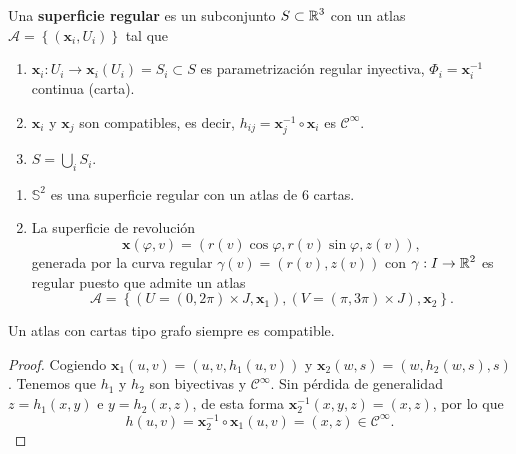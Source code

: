 \begin{definition}
	Una \textbf{superficie regular} es un subconjunto $\displaystyle S \subset \mathbb{R}^{3} $ con un atlas $\displaystyle \mathcal{A} = \left\{ \left( \textbf{x} _{i}, U_{i}\right)\right\}  $ tal que 
	\begin{enumerate}
	\item $\displaystyle \textbf{x} _{i} : U _{i}\to \textbf{x} _{i}\left(U_{i}\right)=S_{i} \subset S $ es parametrización regular inyectiva, $\displaystyle \Phi_{i} = \textbf{x} _{i}^{-1} $ continua (carta).
	\item $\displaystyle \textbf{x} _{i} $ y $\displaystyle \textbf{x} _{j} $ son compatibles, es decir, $\displaystyle h_{ij}= \textbf{x} _{j}^{-1}\circ \textbf{x} _{i} $ es $\displaystyle \mathcal{C}^{\infty } $. 
	\item $\displaystyle S = \bigcup_{i}S_{i} $.
	\end{enumerate}
\end{definition}
\begin{eg}
\begin{enumerate}
\item $\displaystyle \mathbb{S}^{2} $ es una superficie regular con un atlas de 6 cartas. 
\item La superficie de revolución 
	\[ \textbf{x} \left(\varphi, v\right)=\left(r\left(v\right)\cos\varphi, r\left(v\right)\sin\varphi, z\left(v\right)\right) ,\]
	generada por la curva regular $\displaystyle \gamma\left(v\right)=\left(r\left(v\right), z\left(v\right)\right) $ con $\displaystyle \gamma : I \to \mathbb{R}^{2} $ es regular puesto que admite un atlas 
	\[ \mathcal{A} = \left\{ \left(U = \left(0,2\pi \right) \times J, \textbf{x} _{1}\right), \left(V = \left(\pi , 3\pi \right)\times J\right), \textbf{x} _{2}\right\}  .\] 
\end{enumerate}
\end{eg}
\begin{lema}
Un atlas con cartas tipo grafo siempre es compatible.
\end{lema}
\begin{proof}
Cogiendo $\displaystyle \textbf{x} _{1}\left(u,v\right)=\left(u,v,h_{1}\left(u,v\right)\right) $ y $\displaystyle \textbf{x} _{2}\left(w,s\right)=\left(w, h_{2}\left(w,s\right), s\right) $. Tenemos que $\displaystyle h_{1} $ y $\displaystyle h_{2} $ son biyectivas y $\displaystyle \mathcal{C}^{\infty } $. Sin pérdida de generalidad $\displaystyle z = h_{1}\left(x,y\right) $ e $\displaystyle y = h_{2}\left(x,z\right) $, de esta forma $\displaystyle \textbf{x} _{2}^{-1}\left(x,y,z\right)=\left(x,z\right) $, por lo que 
\[ h\left(u,v\right) = \textbf{x} _{2}^{-1}\circ \textbf{x} _{1} \left(u,v\right)= \left(x,z\right) \in \mathcal{C}^{\infty }.\]
\end{proof}
